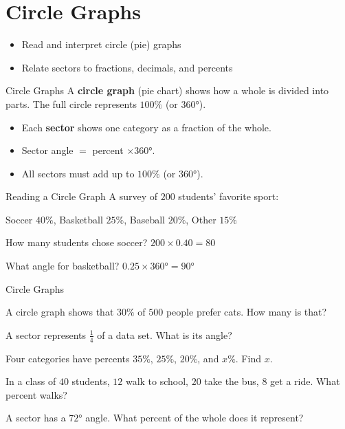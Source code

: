 \section{Circle Graphs}

\begin{learningGoals}
\begin{itemize}
    \item Read and interpret circle (pie) graphs
    \item Relate sectors to fractions, decimals, and percents
\end{itemize}
\end{learningGoals}

\begin{conceptBox}{Circle Graphs}
A \textbf{circle graph} (pie chart) shows how a whole is divided into parts. The full circle represents $100\%$ (or $360°$).

\begin{itemize}[leftmargin=*]
    \item Each \textbf{sector} shows one category as a fraction of the whole.
    \item Sector angle $=$ percent $\times 360°$.
    \item All sectors must add up to $100\%$ (or $360°$).
\end{itemize}
\end{conceptBox}

\begin{workedExample}{Reading a Circle Graph}
A survey of $200$ students' favorite sport:

Soccer $40\%$, Basketball $25\%$, Baseball $20\%$, Other $15\%$

How many students chose soccer? $200 \times 0.40 = 80$

What angle for basketball? $0.25 \times 360° = 90°$
\end{workedExample}


\begin{practiceBox}{Circle Graphs}
\resetProblems

\prob A circle graph shows that $30\%$ of $500$ people prefer cats. How many is that?

\prob A sector represents $\frac{1}{4}$ of a data set. What is its angle?

\prob Four categories have percents $35\%$, $25\%$, $20\%$, and $x\%$. Find $x$.

\prob In a class of $40$ students, $12$ walk to school, $20$ take the bus, $8$ get a ride. What percent walks?

\prob A sector has a $72°$ angle. What percent of the whole does it represent?

\end{practiceBox}
